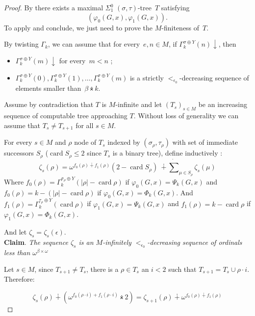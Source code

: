 \documentclass{article}
\numberwithin{theorem}{section}
\newcommand{\card}{\operatorname{card}}
\newcommand{\nplus}{\dotplus}
\newcommand{\ntimes}{\dottimes}
\newcommand{\nsum}{\dot{\sum}}
\begin{document}
\begin{proof}
By  there exists a maximal $\Sigma^0_1$ $(\sigma, \tau)$-tree~$T$ satisfying $$(\varphi_0(G, x), \varphi_1(G,x)).$$ To apply  and conclude, we just need to prove the $M$-finiteness of~$T$. 

By twisting $\Gamma_k$, we can assume that for every~$e, n \in M$, if $\Gamma^{\sigma \oplus Y}_k(n)\downarrow$, then
\begin{itemize}
    \item $\Gamma^{\sigma \oplus Y}_k(m)\downarrow$ for every~$m < n$ ;
    \item $\Gamma^{\sigma \oplus Y}_k(0), \Gamma^{\sigma \oplus Y}_k(1), \dots, \Gamma^{\sigma \oplus Y}_k(m)$ is a strictly $<_{\epsilon_0}$-decreasing sequence of elements smaller than~$\beta \ntimes k$.
\end{itemize}

Assume by contradiction that $T$ is $M$-infinite and let $(T_s)_{s \in M}$ be an increasing sequence of computable tree approaching $T$. Without loss of generality we can assume that $T_s \neq T_{s+1}$ for all $s \in M$.

For every $s \in M$ and $\rho$ node of $T_s$ indexed by $(\sigma_{\rho}, \tau_{\rho})$ with set of immediate successors $S_\rho$ ($\card S_\rho \leq 2$ since $T_s$ is a binary tree), define inductively :
$$\zeta_s(\rho) = \omega^{f_0(\rho) \nplus f_1(\rho)}(2 - \card S_\rho)\ \nplus \nsum_{\mu \in S_\rho} \zeta_s(\mu)
$$
Where $f_0(\rho) = \Gamma_k^{\sigma_{\rho} \oplus Y}(|\rho| - \card \rho)$ if $\varphi_0(G,x) = \Psi_k(G,x)$ and $f_0(\rho) = k - (|\rho| - \card \rho)$ if $\varphi_0(G,x) = \Phi_k(G,x)$. And $f_1(\rho) = \Gamma_k^{\tau_{\rho} \oplus Y}(\card \rho)$ if $\varphi_1(G,x) = \Psi_k(G,x)$ and $f_1(\rho) = k - \card \rho$ if $\varphi_1(G,x) = \Phi_k(G,x)$.

And let $\zeta_s = \zeta_s(\epsilon)$. \\

\textbf{Claim}. \emph{The sequence $\zeta_s$ is an $M$-infinitely $<_{\epsilon_0}$-decreasing sequence of ordinals less than $\omega^{\beta \times \omega}$}

Let $s \in M$, since $T_{s+1} \neq T_s$, there is a $\rho \in T_s$ an $i < 2$ such that $T_{s+1} = T_s \cup \rho \cdot i$. Therefore:

$$\zeta_{s}(\rho) \nplus (\omega^{f_0(\rho \cdot i) + f_1(\rho \cdot i)} \ntimes 2) = \zeta_{s+1}(\rho) \nplus \omega^{f_0(\rho) \nplus f_1(\rho)}$$


\end{proof}
\end{document}
